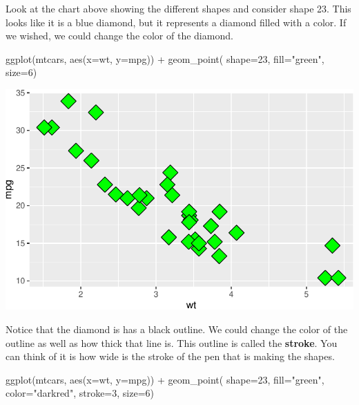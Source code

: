 \documentclass[
  letterpaper,
  DIV=11,
  numbers=noendperiod]{scrreprt}
\newenvironment{Shaded}{\begin{snugshade}}{\end{snugshade}}
\newcommand{\AttributeTok}[1]{\textcolor[rgb]{0.40,0.45,0.13}{#1}}
\newcommand{\DecValTok}[1]{\textcolor[rgb]{0.68,0.00,0.00}{#1}}
\newcommand{\FunctionTok}[1]{\textcolor[rgb]{0.28,0.35,0.67}{#1}}
\newcommand{\NormalTok}[1]{\textcolor[rgb]{0.00,0.23,0.31}{#1}}
\newcommand{\SpecialCharTok}[1]{\textcolor[rgb]{0.37,0.37,0.37}{#1}}
\newcommand{\StringTok}[1]{\textcolor[rgb]{0.13,0.47,0.30}{#1}}
\begin{document}
Look at the chart above showing the different shapes and consider shape
23. This looks like it is a blue diamond, but it represents a diamond
filled with a color. If we wished, we could change the color of the
diamond.

\begin{Shaded}
\begin{Highlighting}[]
\FunctionTok{ggplot}\NormalTok{(mtcars, }\FunctionTok{aes}\NormalTok{(}\AttributeTok{x=}\NormalTok{wt, }\AttributeTok{y=}\NormalTok{mpg)) }\SpecialCharTok{+}
  \FunctionTok{geom\_point}\NormalTok{( }\AttributeTok{shape=}\DecValTok{23}\NormalTok{, }\AttributeTok{fill=}\StringTok{"green"}\NormalTok{, }\AttributeTok{size=}\DecValTok{6}\NormalTok{)}
\end{Highlighting}
\end{Shaded}

\includegraphics{Advanced_Scatterplot_Techniques_files/figure-pdf/unnamed-chunk-6-1.pdf}

Notice that the diamond is has a black outline. We could change the
color of the outline as well as how thick that line is. This outline is
called the \textbf{stroke}. You can think of it is how wide is the
stroke of the pen that is making the shapes.

\begin{Shaded}
\begin{Highlighting}[]
\FunctionTok{ggplot}\NormalTok{(mtcars, }\FunctionTok{aes}\NormalTok{(}\AttributeTok{x=}\NormalTok{wt, }\AttributeTok{y=}\NormalTok{mpg)) }\SpecialCharTok{+}
  \FunctionTok{geom\_point}\NormalTok{( }\AttributeTok{shape=}\DecValTok{23}\NormalTok{, }\AttributeTok{fill=}\StringTok{"green"}\NormalTok{, }\AttributeTok{color=}\StringTok{"darkred"}\NormalTok{, }\AttributeTok{stroke=}\DecValTok{3}\NormalTok{, }\AttributeTok{size=}\DecValTok{6}\NormalTok{)}
\end{Highlighting}
\end{Shaded}
\end{document}
